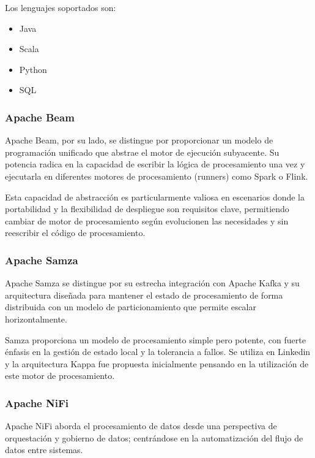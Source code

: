 Los lenguajes soportados son:

\begin{itemize}
    \item Java
    \item Scala
    \item Python
    \item SQL
\end{itemize}

\subsubsection{Apache Beam}

Apache Beam, por su lado, se distingue por proporcionar un modelo de programación unificado que abstrae el motor de ejecución subyacente.
Su potencia radica en la capacidad de escribir la lógica de procesamiento una vez y ejecutarla en 
diferentes motores de procesamiento (runners) como Spark o Flink.\newline

Esta capacidad de abstracción es particularmente valiosa en escenarios donde la portabilidad y la flexibilidad de despliegue son requisitos clave, 
permitiendo cambiar de motor de procesamiento según evolucionen las necesidades y sin reescribir el código de procesamiento.

\subsubsection{Apache Samza}

Apache Samza se distingue por su estrecha integración con Apache Kafka y su arquitectura diseñada para mantener el estado 
de procesamiento de forma distribuida con un modelo de particionamiento que permite escalar horizontalmente.\newline

Samza proporciona un modelo de procesamiento simple pero potente, con fuerte énfasis en la gestión de estado local y la tolerancia a fallos.
Se utiliza en Linkedin y la arquitectura Kappa fue propuesta inicialmente pensando en la utilización de este motor de procesamiento.

\subsubsection{Apache NiFi}

Apache NiFi aborda el procesamiento de datos desde una perspectiva de orquestación y gobierno de datos; 
centrándose en la automatización del flujo de datos entre sistemas.\newline

